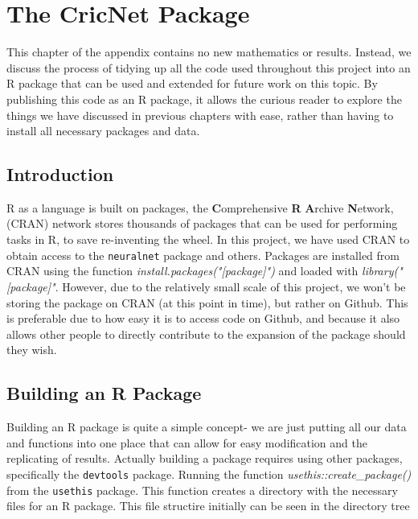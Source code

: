 \chapter{The CricNet Package}

This chapter of the appendix contains no new mathematics or results. Instead, we discuss the process of tidying up all the code used throughout this project into an R package that can be used and extended for future work on this topic. By publishing this code as an R package, it allows the curious reader to explore the things we have discussed in previous chapters with ease, rather than having to install all necessary packages and data.\\

\section{Introduction}

R as a language is built on packages, the \textbf{C}omprehensive \textbf{R} \textbf{A}rchive \textbf{N}etwork, (CRAN) network stores 
thousands of packages that can be used for performing tasks in R, to save re-inventing the wheel. In this project, we have used CRAN to obtain 
access to the \verb|neuralnet| package and others. Packages are installed from CRAN using the function \textit{install.packages("[package]")} and loaded with \textit{library("[package]"}. However, due to the relatively small scale of this project, we won't be storing the package on CRAN (at this point in time), but rather on Github. This is preferable due to how easy it is to access code on Github, and because it also allows other people to directly contribute to the expansion of the package should they wish.  

\section{Building an R Package}

Building an R package is quite a simple concept- we are just putting all our data and functions into one place that can allow for easy modification and the replicating of results. Actually building a package requires using other packages, specifically the \verb|devtools| package. Running the function \textit{usethis::create_package()} from the \verb|usethis| package. This function creates a directory with the necessary files for an R package. This file structire initially can be seen in the directory tree

